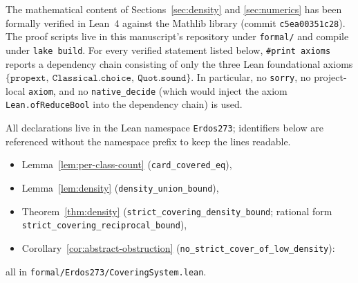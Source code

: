 \documentclass[11pt,a4paper]{article}
\theoremstyle{plain}
\theoremstyle{definition}
\theoremstyle{remark}
\begin{document}
The mathematical content of Sections~\ref{sec:density} and
\ref{sec:numerics} has been formally verified in Lean~4 against the
Mathlib library (commit \texttt{c5ea00351c28}). The proof scripts
live in this manuscript's repository under \texttt{formal/} and
compile under \texttt{lake build}. For every verified statement
listed below, \texttt{\#print axioms} reports a dependency chain
consisting of only the three Lean foundational axioms
$\{\texttt{propext},\ \texttt{Classical.choice},\ \texttt{Quot.sound}\}$.
In particular, no \texttt{sorry}, no project-local \texttt{axiom},
and no \texttt{native\_decide} (which would inject the axiom
\texttt{Lean.ofReduceBool} into the dependency chain) is used.

\begin{sloppypar}
All declarations live in the Lean namespace \texttt{Erdos273};
identifiers below are referenced without the namespace prefix to
keep the lines readable.

\begin{itemize}
  \item Lemma~\ref{lem:per-class-count}
        (\texttt{card\_covered\_eq}),
  \item Lemma~\ref{lem:density}
        (\texttt{density\_union\_bound}),
  \item Theorem~\ref{thm:density}
        (\texttt{strict\_covering\_density\_bound};
        rational form \texttt{strict\_covering\_reciprocal\_bound}),
  \item Corollary~\ref{cor:abstract-obstruction}
        (\texttt{no\_strict\_cover\_of\_low\_density}):
\end{itemize}
all in \texttt{formal/Erdos273/CoveringSystem.lean}.


\end{sloppypar}
\end{document}
